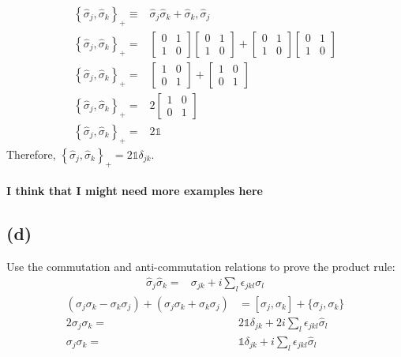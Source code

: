 \documentclass[12pt, a4paper]{article}
\begin{document}
\begin{align*}
\left\{\hat{\sigma}_j,\hat{\sigma}_k\right\}_+ \equiv& \hat{\sigma}_j \hat{\sigma}_k + \hat{\sigma}_k,\hat{\sigma}_j 
\\
\left\{\hat{\sigma}_j,\hat{\sigma}_k\right\}_+=& 
\begin{bmatrix}0&1\\1&0\end{bmatrix}
\begin{bmatrix}0&1\\1&0\end{bmatrix} +
\begin{bmatrix}0&1\\1&0\end{bmatrix}
\begin{bmatrix}0&1\\1&0\end{bmatrix}
\\
\left\{\hat{\sigma}_j,\hat{\sigma}_k\right\}_+=& 
\begin{bmatrix}1&0\\0&1\end{bmatrix} +
\begin{bmatrix}1&0\\0&1\end{bmatrix}
\\
\left\{\hat{\sigma}_j,\hat{\sigma}_k\right\}_+=& 2\begin{bmatrix}1&0\\0&1\end{bmatrix}
\\
\left\{\hat{\sigma}_j,\hat{\sigma}_k\right\}_+=& 2\mathds{1}
\end{align*}
Therefore, $\boxed{\left\{\hat{\sigma}_j,\hat{\sigma}_k\right\}_+  = 2\mathds{1}\delta_{jk}}$.\\
\\
\textbf{I think that I might need more examples here}
\subsection*{(d)} 
Use the commutation and anti-commutation relations to prove the product rule:
\begin{align*}
\hat{\sigma}_j \hat{\sigma}_k =& \sigma_{jk} + i\sum_l \epsilon_{jkl}\sigma_l
\end{align*}
\begin{align*}
(\sigma _{j}\sigma _{k}-\sigma _{k}\sigma _{j})+(\sigma _{j}\sigma _{k}+\sigma _{k}\sigma _{j})&=
\left[\sigma_{j},\sigma _{k}\right]+\{\sigma _{j},\sigma _{k}\}
\\
2\sigma _{j}\sigma _{k} =& 2\mathds{1}\delta_{jk} + 2i\sum_l \epsilon_{jkl}\hat{\sigma}_l
\\
\sigma _{j}\sigma _{k} =& \mathds{1}\delta_{jk} + i\sum_l \epsilon_{jkl}\hat{\sigma}_l
\\
\end{align*}
\end{document}

